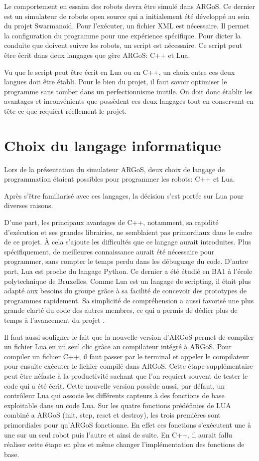 \documentclass[a4paper,12pt]{report}
\begin{document}
Le comportement en essaim des robots devra être simulé dans ARGoS. Ce dernier est un simulateur de robots open source qui a initialement été développé au sein du projet Swarmanoid. Pour l'exécuter, un fichier XML est nécessaire. Il permet la configuration du programme pour une expérience spécifique. Pour dicter la conduite que doivent suivre les robots, un script est nécessaire. Ce script peut être écrit dans deux langages que gère ARGoS: C++ et Lua.

Vu que le script peut être écrit en Lua ou en C++, un choix entre ces deux langues doit être établi. Pour le bien du projet, il faut savoir optimiser le programme sans tomber dans un perfectionnisme inutile. On doit donc établir les avantages et inconvénients que possèdent ces deux langages tout en conservant en tête ce que requiert réellement le projet.

\chapter{Choix du langage informatique}

Lors de la présentation du simulateur ARGoS, deux choix de langage de programmation étaient possibles pour programmer les robots: C++ et Lua.

Après s’être familiarisé avec ces langages, la décision s'est portée sur Lua pour diverses raisons.

D'une part, les principaux avantages de C++, notamment, sa rapidité d’exécution et ses grandes librairies, ne semblaient pas primordiaux dans le cadre de ce projet. À cela s'ajoute les difficultés que ce langage aurait introduites. Plus spécifiquement, de meilleures connaissance aurait été nécessaire pour programmer, sans compter le temps perdu dans les débuguage du code.
D'autre part, Lua est proche du langage Python. Ce dernier a été étudié en BA1 à l'école polytechnique de Bruxelles. Comme Lua est un langage de scripting, il était plus adapté aux besoins du groupe grâce à sa facilité de concevoir des prototypes de programmes rapidement. Sa simplicité de compréhension a aussi favorisé une plus grande clarté du code des autres membres, ce qui a permis de dédier plus de temps à l’avancement du projet \cite{compC++,compLua}.

Il faut aussi souligner le fait que la nouvelle version d'ARGoS permet de compiler un fichier Lua en un seul clic grâce au compilateur intégré à ARGoS. Pour compiler un fichier C++, il faut passer par le terminal et appeler le compilateur pour ensuite exécuter le fichier compilé dans ARGoS. Cette étape supplémentaire peut être néfaste à la productivité sachant que l'on requiert souvent de tester le code qui a été écrit. Cette nouvelle version possède aussi, par défaut, un contrôleur Lua qui associe les différents capteurs à des fonctions de base exploitable dans un code Lua. Sur les quatre fonctions prédéfinies de LUA combiné a ARGoS (init, step, reset et destroy), les trois premières sont primordiales pour qu'ARGoS fonctionne. En effet ces fonctions s’exécutent une à une sur un seul robot puis l'autre et ainsi de suite. En C++, il aurait fallu réaliser cette étape en plus et même changer l'implémentation des fonctions de base.
\end{document}
